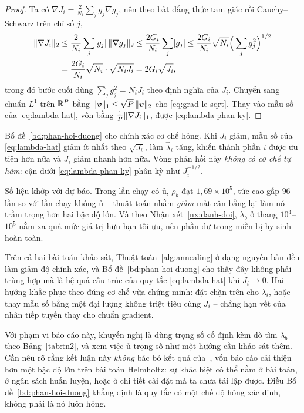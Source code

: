 \begin{proof}
Ta có $\nabla J_i = \frac{2}{N_i}\sum_j g_j \nabla g_j$, nên theo bất đẳng thức
tam giác rồi Cauchy--Schwarz trên chỉ số $j$,
\begin{align*}
\lVert\nabla J_i\rVert_{2}
 &\le \frac{2}{N_i}\sum_j \lvert g_j\rvert\,\lVert\nabla g_j\rVert_2
  \le \frac{2G_i}{N_i}\sum_j \lvert g_j\rvert
  \le \frac{2G_i}{N_i}\sqrt{N_i}\Big(\sum_j g_j^2\Big)^{1/2}\\
 &= \frac{2G_i}{N_i}\sqrt{N_i}\cdot\sqrt{N_i J_i}
  = 2G_i\sqrt{J_i},
\end{align*}
trong đó bước cuối dùng $\sum_j g_j^2 = N_i J_i$ theo định nghĩa của $J_i$.
Chuyển sang chuẩn $L^1$ trên $\mathbb{R}^P$ bằng
$\lVert\bm{v}\rVert_1 \le \sqrt{P}\,\lVert\bm{v}\rVert_2$ cho
\eqref{eq:grad-le-sqrt}. Thay vào mẫu số của \eqref{eq:lambda-hat}, vốn bằng
$\tfrac{1}{P}\lVert\nabla J_i\rVert_1$, được \eqref{eq:lambda-phan-ky}.
\end{proof}
 
Bổ đề~\ref{bd:phan-hoi-duong} cho chính xác cơ chế hỏng. Khi $J_i$ giảm, mẫu số
của \eqref{eq:lambda-hat} giảm ít nhất theo $\sqrt{J_i}$, làm $\hat{\lambda}_i$
tăng, khiến thành phần $i$ được ưu tiên hơn nữa và $J_i$ giảm nhanh hơn nữa. Vòng
phản hồi này \emph{không có cơ chế tự hãm}: cận dưới \eqref{eq:lambda-phan-ky}
phân kỳ như $J_i^{-1/2}$.
 
Số liệu khớp với dự báo. Trong lần chạy có ủ, $\rho_b$ đạt $1{,}69\times10^5$, tức
cao gấp $96$ lần so với lần chạy không ủ -- thuật toán nhằm \emph{giảm} mất cân bằng lại
làm nó trầm trọng hơn hai bậc độ lớn. Và theo
Nhận xét~\ref{nx:danh-doi}, $\lambda_b$ ở thang $10^4$--$10^5$ nằm xa quá mức giá
trị hữu hạn tối ưu, nên phần dư trong miền bị hy sinh hoàn toàn.
 
\begin{nhanxet}
\label{nx:ket-luan-anneal}
Trên cả hai bài toán khảo sát, Thuật toán~\ref{alg:annealing} ở dạng nguyên bản
đều làm giảm độ chính xác, và Bổ đề~\ref{bd:phan-hoi-duong} cho thấy đây không
phải trùng hợp mà là hệ quả cấu trúc của quy tắc \eqref{eq:lambda-hat} khi
$J_i \to 0$. Hai hướng khắc phục theo đúng cơ chế vừa chứng minh: đặt chặn trên
cho $\lambda_i$, hoặc thay mẫu số bằng một đại lượng không triệt tiêu cùng $J_i$
-- chẳng hạn vết của nhân tiếp tuyến thay cho chuẩn gradient.
 
Với phạm vi báo cáo này, khuyến nghị là dùng trọng số cố định kèm dò tìm
$\lambda_b$ theo Bảng~\ref{tab:tn2}, và xem việc ủ trọng số như một hướng cần khảo
sát thêm. Cần nêu rõ rằng kết luận này \emph{không} bác bỏ kết quả
của~\cite{wang2021}, vốn báo cáo cải thiện hơn một bậc độ lớn trên bài toán
Helmholtz: sự khác biệt có thể nằm ở bài toán, ở ngân sách huấn luyện, hoặc ở chi
tiết cài đặt mà ta chưa tái lập được. Điều Bổ đề~\ref{bd:phan-hoi-duong} khẳng
định là quy tắc có một chế độ hỏng xác định, không phải là nó luôn hỏng.
\end{nhanxet}
 
